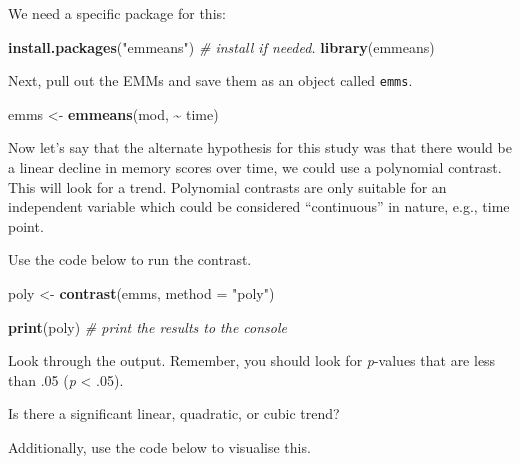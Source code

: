 \documentclass[
]{book}
\newenvironment{Shaded}{\begin{snugshade}}{\end{snugshade}}
\newcommand{\AttributeTok}[1]{\textcolor[rgb]{0.13,0.29,0.53}{#1}}
\newcommand{\CommentTok}[1]{\textcolor[rgb]{0.56,0.35,0.01}{\textit{#1}}}
\newcommand{\FunctionTok}[1]{\textcolor[rgb]{0.13,0.29,0.53}{\textbf{#1}}}
\newcommand{\NormalTok}[1]{#1}
\newcommand{\OtherTok}[1]{\textcolor[rgb]{0.56,0.35,0.01}{#1}}
\newcommand{\SpecialCharTok}[1]{\textcolor[rgb]{0.81,0.36,0.00}{\textbf{#1}}}
\newcommand{\StringTok}[1]{\textcolor[rgb]{0.31,0.60,0.02}{#1}}
\begin{document}
We need a specific package for this:

\begin{Shaded}
\begin{Highlighting}[]
\FunctionTok{install.packages}\NormalTok{(}\StringTok{"emmeans"}\NormalTok{) }\CommentTok{\# install if needed.}
\FunctionTok{library}\NormalTok{(emmeans)}
\end{Highlighting}
\end{Shaded}

Next, pull out the EMMs and save them as an object called \texttt{emms}.

\begin{Shaded}
\begin{Highlighting}[]
\NormalTok{emms }\OtherTok{\textless{}{-}} \FunctionTok{emmeans}\NormalTok{(mod, }\SpecialCharTok{\textasciitilde{}}\NormalTok{ time)}
\end{Highlighting}
\end{Shaded}

Now let's say that the alternate hypothesis for this study was that there would be a linear decline in memory scores over time, we could use a polynomial contrast. This will look for a trend. Polynomial contrasts are only suitable for an independent variable which could be considered ``continuous'' in nature, e.g., time point.

Use the code below to run the contrast.

\begin{Shaded}
\begin{Highlighting}[]
\NormalTok{poly }\OtherTok{\textless{}{-}} \FunctionTok{contrast}\NormalTok{(emms, }\AttributeTok{method =} \StringTok{"poly"}\NormalTok{)}

\FunctionTok{print}\NormalTok{(poly) }\CommentTok{\# print the results to the console}
\end{Highlighting}
\end{Shaded}

Look through the output. Remember, you should look for \emph{p}-values that are less than .05 (\emph{p} \textless{} .05).

Is there a significant linear, quadratic, or cubic trend?

Additionally, use the code below to visualise this.
\end{document}

